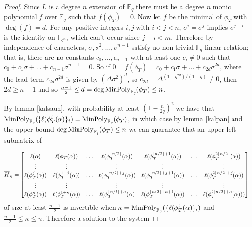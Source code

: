 \documentclass{acmart}
\theoremstyle{remark}
\numberwithin{equation}{section}
\newcommand{\minpol}{\textnormal{MinPoly}_{\mathbb{F}_q}}
\DeclarePairedDelimiter\floor{\lfloor}{\rfloor}
\begin{document}
\begin{proof}
Since $L$ is a degree $n$ extension of $\mathbb{F}_q$ there must be a degree $n$ monic polynomial $f$ over $\mathbb{F}_q$ such that $f(\phi_T) = 0$. Now let $f$ be the minimal of $\phi_T$ with $\deg(f) = d$. For any positive integers $i,j$ with $i < j < n$, $ \sigma^i = \sigma^j$ implies $\sigma^{j-i}$ is the identity on $\mathbb{F}_{q^n}$, which can't occur since $j - i < m$. Therefore by independence of characters, $\sigma, \sigma^2, \ldots, \sigma^{n-1}$ satisfy no non-trivial $\mathbb{F}_q$-linear relation; that is, there are no constants $c_0, \ldots, c_{n-1}$ with at least one $c_i \neq 0$ such that $c_0 + c_1 \sigma + \ldots + c_{n-1}\sigma^{n-1} = 0$. So if $ 0 = f(\phi_T) = c_0 + c_1 \sigma + \ldots + c_{2d} \sigma^{2d}$, where the lead term $c_{2d} \sigma^{2d}$ is given by $(\Delta \sigma^2)^d$, so $c_{2d} = \Delta^{(1-q^{2d})/(1-q)} \neq 0$, then $2d \geq n-1$ and so $\frac{n-1}{2} \leq d = \deg \minpol(\phi_T) \leq n$.

By lemma \ref{kalsaun}, with probability at least $(1 - \frac{n}{2q})^2$ we have that $\minpol(\{\ell(\phi_T^i(\alpha)\}_i) = \minpol(\phi_T)$, in which case by lemma \ref{kalpan} and the upper bound $\deg \minpol(\phi_T) \leq n$  we can guarantee that an upper left submatrix of

\[\overline{H}_{\kappa} = \begin{bmatrix}\ell(\alpha) & \ell(\phi_T(\alpha)) & \ldots & \ell(\phi_T^{\floor*{n/2}}(\alpha)) & \ell(\phi_T^{\floor*{n/2} + 1}(\alpha)) & \ldots & \ell(\phi_T^{2\floor{n/2}}(\alpha))

\\ \vdots & \vdots & & \vdots & \vdots & & \vdots \\ 

\ell(\phi_T^{j}(\alpha)) & \ell(\phi_T^{1+j}(\alpha)) & \ldots & \ell(\phi_T^{\floor*{n/2}+j}(\alpha)) & \ell(\phi_T^{\floor*{n/2} +j + 1}(\alpha)) & \ldots & \ell(\phi_T^{2\floor{n/2} + j}(\alpha))

\\ \vdots & \vdots & & \vdots & \vdots & & \vdots \\

\ell(\phi_T^{\kappa}(\alpha)) & \ell(\phi_T^{1 + \kappa }(\alpha)) & \ldots & \ell(\phi_T^{\floor*{n/2} + \kappa}(\alpha) & \ell(\phi_T^{\floor*{n/2} + \kappa + 1}(\alpha)) & \ldots & \ell(\phi_T^{2\floor{n/2} + \kappa}(\alpha)))

\end{bmatrix} \]
\noindent of size at least $\frac{n-1}{2}$ is invertible when $\kappa = \minpol(\{\ell(\phi_T^i(\alpha)\}_i)$ and $\frac{n-1}{2} \leq \kappa \leq n$. Therefore a solution to the system


\end{proof}
\end{document}

